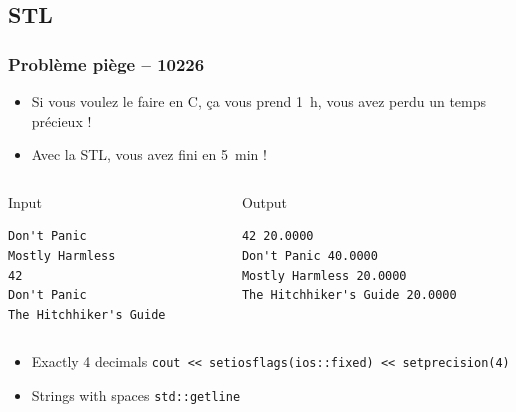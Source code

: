 \documentclass[10pt,svgnames,usenames,table]{beamer} %
\begin{document}
\subsection{STL}
\begin{frame}[fragile]
  \frametitle{Problème piège -- 10226}
  \begin{itemize}
    \item Si vous voulez le faire en C,
      ça vous prend \SI{1}{h}, vous avez perdu un temps précieux !
    \item Avec la STL, vous avez fini en \SI{5}{min} !
  \end{itemize}
  \begin{columns}
    \begin{column}{0.5\textwidth}
      \begin{block}{Input}
        \begin{verbatim}
Don't Panic
Mostly Harmless
42
Don't Panic
The Hitchhiker's Guide
        \end{verbatim}
      \end{block}
    \end{column}
    \begin{column}{0.5\textwidth}
      \begin{block}{Output}
        \begin{verbatim}
42 20.0000
Don't Panic 40.0000
Mostly Harmless 20.0000
The Hitchhiker's Guide 20.0000
        \end{verbatim}
      \end{block}
    \end{column}
  \end{columns}
  \begin{itemize}
    \item Exactly 4 decimals \lstinline|cout << setiosflags(ios::fixed) << setprecision(4)|
    \item Strings with spaces \lstinline|std::getline|
  \end{itemize}
\end{frame}
\end{document}
